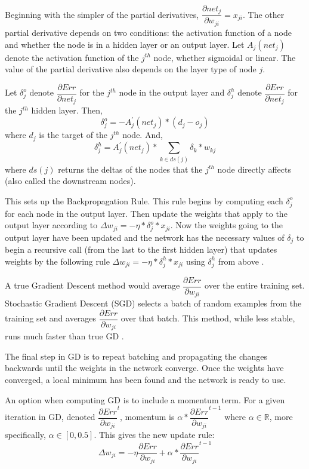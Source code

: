 \documentclass[twoside,10pt]{article}
\newcommand{\jth}{$j^{th}$ }
\begin{document}
Beginning with the simpler of the partial derivatives, $\dfrac{\partial net_j}{\partial w_{ji}} = x_{ji}$.
The other partial derivative depends on two conditions: the activation function of a node and whether the node is in a hidden layer or an output layer. Let $A_j(net_j)$ denote the activation function of the \jth node, whether sigmoidal or linear.
The value of the partial derivative also depends on the layer type of node $j$.

Let $\delta _j^o$ denote $\dfrac{\partial Err}{\partial net_{j}}$ for the \jth node in the output layer and $\delta ^h_j$ denote $\dfrac{\partial Err}{\partial net_{j}}$ for the \jth hidden layer.
Then,
$$\delta _j^o = -A^\prime _j (net_j) * (d_j - o_j)$$
where $d_j$ is the target of the \jth node. And,
$$\delta ^h_j = A^\prime _j (net_j) * \sum_{k \in ds(j)} \delta _k * w_{kj}$$
where $ds(j)$ returns the deltas of the nodes that the \jth node directly affects (also called the downstream nodes).

This sets up the Backpropagation Rule. This rule begins by computing each $\delta _j^o$ for each node in the output layer. Then update the weights that apply to the output layer according to
$\Delta w_{ji} = - \eta * \delta _j^o * x_{ji}$.
Now the weights going to the output layer have been updated and the network has the necessary values of $\delta _j$ to begin a recursive call (from the last to the first hidden layer) that updates weights by the following rule
$\Delta w_{ji} = - \eta * \delta _j^h * x_{ji}$ using $\delta _j^h$
from above \citep{rumelhart1988learning}.

A true Gradient Descent method would average $\dfrac{\partial Err}{\partial w_{ji}}$ over the entire training set. Stochastic Gradient Descent (SGD) selects a batch of random examples from the training set and averages $\dfrac{\partial Err}{\partial w_{ji}}$ over that batch. This method, while less stable, runs much faster than true GD \citep{svozil1997ffnn}.

The final step in GD is to repeat batching and propagating the changes backwards until the weights in the network converge. Once the weights have converged, a local minimum has been found and the network is ready to use.

An option when computing GD is to include a momentum term. For a given iteration in GD, denoted
$\dfrac{\partial Err}{\partial w_{ji}}^t$, momentum is $\alpha * \dfrac{\partial Err}{\partial w_{ji}}^{t-1}$ where $\alpha \in \mathbb{R}$, more specifically, $\alpha \in [0,0.5]$.
This gives the new update rule:
$$\Delta w_{ji} = - \eta \dfrac{\partial Err}{\partial w_{ji}} + \alpha * \dfrac{\partial Err}{\partial w_{ji}}^{t-1}$$
\end{document}
